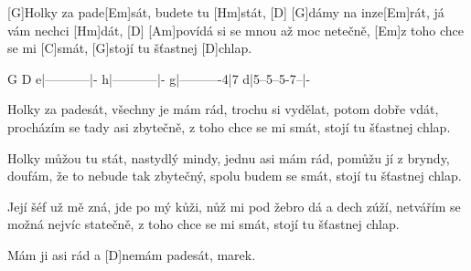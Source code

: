 [G]Holky za pade[Em]sát, budete tu [Hm]stát, [D]
[G]dámy na inze[Em]rát, já vám nechci [Hm]dát, [D]
[Am]povídá si se mnou až moc netečně,
[Em]z toho chce se mi [C]smát, [G]stojí tu šťastnej [D]chlap.

\btab
  G           D
e|-----------|-
h|-----------|-
g|----------4|7
d|5--5--5-7--|-
\etab

Holky za padesát, všechny je mám rád,
trochu si vydělat, potom dobře vdát,
procházím se tady asi zbytečně,
z toho chce se mi smát, stojí tu šťastnej chlap.

Holky můžou tu stát, nastydlý mindy,
jednu asi mám rád, pomůžu jí z bryndy,
doufám, že to nebude tak zbytečný,
spolu budem se smát, stojí tu šťastnej chlap.

Její šéf už mě zná, jde po mý kůži,
nůž mi pod žebro dá a dech zúží,
netvářím se možná nejvíc statečně,
z toho chce se mi smát, stojí tu šťastnej chlap.

\brep [G]Mám ji asi rád a [D]nemám padesát\erep, marek.


